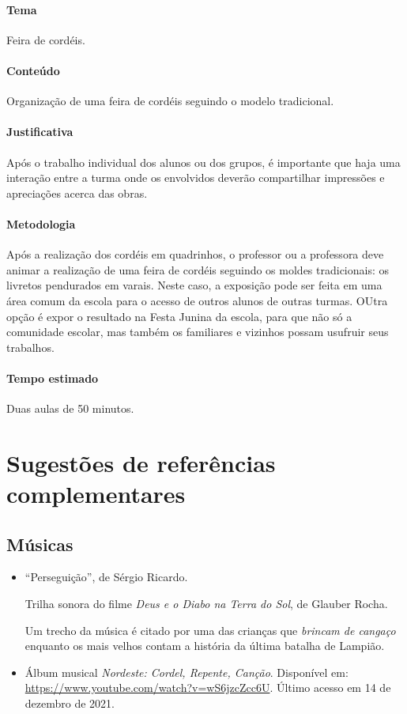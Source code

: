 \documentclass[11pt]{extarticle}
\begin{document}

\paragraph{Tema} Feira de cordéis.

\paragraph{Conteúdo} Organização de uma feira de cordéis seguindo o modelo tradicional.

\paragraph{Justificativa} Após o trabalho individual dos alunos ou dos grupos,
é importante que haja uma interação entre a turma onde os envolvidos
deverão compartilhar impressões e apreciações acerca das obras.

\paragraph{Metodologia} Após a realização dos cordéis em quadrinhos,
 o professor ou a professora deve animar a realização de uma feira de cordéis 
  seguindo os moldes tradicionais: os livretos pendurados em varais.
 Neste caso, a exposição pode ser feita em uma área comum da escola para o acesso de outros alunos
 de outras turmas. OUtra opção é expor o resultado na Festa Junina da escola, para que não só a comunidade
 escolar, mas também os familiares e vizinhos possam usufruir seus trabalhos.


\paragraph{Tempo estimado} Duas aulas de 50 minutos.
 


\section{Sugestões de referências complementares}

\subsection{Músicas} 

\begin{itemize}
	\item ``Perseguição'', de Sérgio Ricardo. 

Trilha sonora do filme \textit{Deus e o Diabo na Terra do Sol}, de Glauber Rocha. 

Um trecho da música é citado por uma das crianças que \textit{brincam de cangaço} enquanto os mais velhos contam a história
da última batalha de Lampião.

	\item Álbum musical \textit{Nordeste: Cordel, Repente, Canção}. Disponível em: \url{https://www.youtube.com/watch?v=wS6jzcZcc6U}. Último acesso em 14 de dezembro de 2021.
\end{itemize}
\end{document}

